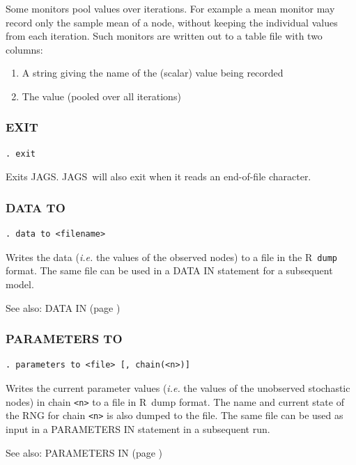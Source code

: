 \documentclass[11pt, a4paper, titlepage]{report}
\newcommand{\JAGS}{\textsf{JAGS}}
\newcommand{\R}{\textsf{R}}
\begin{document}
Some monitors pool values over iterations. For example a mean monitor
may record only the sample mean of a node, without keeping the
individual values from each iteration. Such monitors are written out
to a table file with two columns:
\begin{enumerate}
\item A string giving the name of the (scalar) value being recorded
\item The value (pooled over all iterations)
\end{enumerate}

\subsubsection{EXIT}

\begin{verbatim}
. exit
\end{verbatim}
Exits \JAGS. \JAGS\ will also exit when it reads an end-of-file character.

\subsubsection{DATA TO}
\label{data:to}
\begin{verbatim}
. data to <filename>
\end{verbatim}
Writes the data ({\em i.e.} the values of the observed nodes) to a
file in the \R\ \texttt{dump} format. The same file can be used in a
DATA IN statement for a subsequent model.

See also: DATA IN (page \pageref{data:in})

\subsubsection{PARAMETERS TO}
\label{parameters:to}
\begin{verbatim}
. parameters to <file> [, chain(<n>)]
\end{verbatim}
Writes the current parameter values ({\em i.e.} the values of the
unobserved stochastic nodes) in chain \texttt{<n>} to a file in \R\ dump
format. The name and current state of the RNG for chain \texttt{<n>}
is also dumped to the file.  The same file can be used as input in a
PARAMETERS IN statement in a subsequent run.

See also: PARAMETERS IN (page \pageref{parameters:in})
\end{document}
